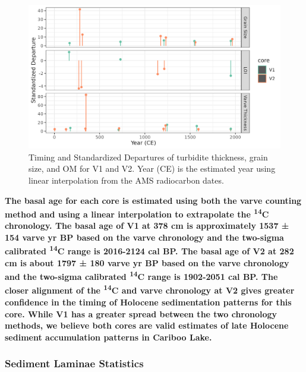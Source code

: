 \documentclass[Royal,times,doublespace,sageh]{sagej}
\begin{document}
\begin{figure}

{\centering \includegraphics[width=1\linewidth]{figs/turbidite_plot} 

}

\caption{Timing and Standardized Departures of turbidite thickness, grain size, and OM for V1 and V2. Year (CE) is the estimated year using linear interpolation from the AMS radiocarbon dates.\label{turbScatter}}\label{fig:turbScatter}
\end{figure}

\textbf{The basal age for each core is estimated using both the varve
counting method and using a linear interpolation to extrapolate the
\textsuperscript{14}C chronology. The basal age of V1 at 378 cm is
approximately 1537 ± 154 varve yr BP based on the varve chronology and
the two-sigma calibrated \textsuperscript{14}C range is 2016-2124 cal
BP. The basal age of V2 at 282 cm is about 1797 ± 180 varve yr BP based
on the varve chronology and the two-sigma calibrated
\textsuperscript{14}C range is 1902-2051 cal BP. The closer alignment of
the \textsuperscript{14}C and varve chronology at V2 gives greater
confidence in the timing of Holocene sedimentation patterns for this
core. While V1 has a greater spread between the two chronology methods,
we believe both cores are valid estimates of late Holocene sediment
accumulation patterns in Cariboo Lake.}

\hypertarget{sediment-laminae-statistics}{%
\subsubsection{Sediment Laminae
Statistics}\label{sediment-laminae-statistics}}
\end{document}
